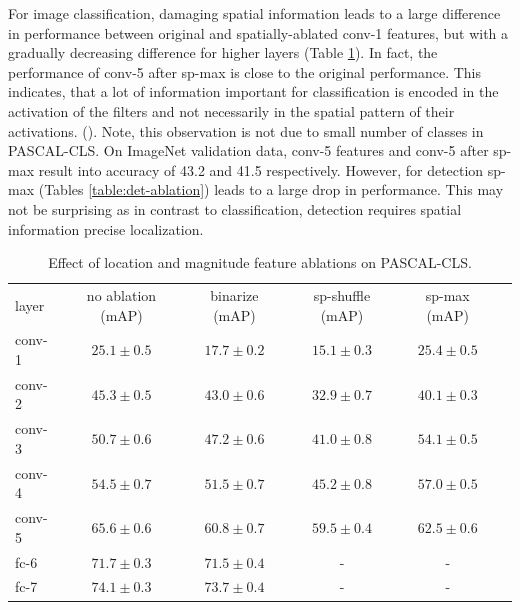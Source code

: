 For image classification, damaging spatial information leads to a large difference in performance between original and spatially-ablated conv-1 features, but with a gradually decreasing difference for higher layers (Table \ref{table:class-ablation}). 
In fact, the performance of conv-5 after sp-max is close to the original performance. 
This indicates, that a lot of information important for classification is encoded in the activation of the filters and not necessarily in the spatial pattern of their activations. ().
Note, this observation is not due to small number of classes in PASCAL-CLS. On ImageNet validation data, conv-5 features and conv-5 after sp-max result into accuracy of 43.2 and 41.5 respectively. 
However, for detection sp-max (Tables \ref{table:det-ablation}) leads to a large drop in performance. 
This may not be surprising as in contrast to classification, detection requires spatial information precise localization.

\setlength{\tabcolsep}{4pt}
\begin{table}[t!]
\begin{center}
\caption{Effect of location and magnitude feature ablations on PASCAL-CLS.}
\label{table:class-ablation}
\begin{tabular}{lccccc}
\noalign{\smallskip}
layer & no ablation (mAP) & binarize (mAP) & sp-shuffle (mAP) & sp-max (mAP) \\
\noalign{\smallskip}
\hline
\noalign{\smallskip}
conv-1 & $25.1 \pm 0.5$ & $17.7 \pm 0.2$ & $15.1 \pm 0.3$ & $25.4 \pm 0.5$  \\ 
conv-2 & $45.3 \pm 0.5$ & $43.0 \pm 0.6$ & $32.9 \pm 0.7$ & $40.1 \pm 0.3$  \\ 
conv-3 & $50.7 \pm 0.6$ & $47.2 \pm 0.6$ & $41.0 \pm 0.8$ & $54.1 \pm 0.5$  \\
conv-4 & $54.5 \pm 0.7$ & $51.5 \pm 0.7$ & $45.2 \pm 0.8$ & $57.0 \pm 0.5$  \\
conv-5 & $65.6 \pm 0.6$ & $60.8 \pm 0.7$ & $59.5 \pm 0.4$ & $62.5 \pm 0.6$  \\
fc-6   & $71.7 \pm 0.3$ & $71.5 \pm 0.4$ &  -             &  -   \\
fc-7   & $74.1 \pm 0.3$ & $73.7 \pm 0.4$ &  -             &  -   \\
\end{tabular}
\end{center}
\end{table}
\setlength{\tabcolsep}{1.4pt}

